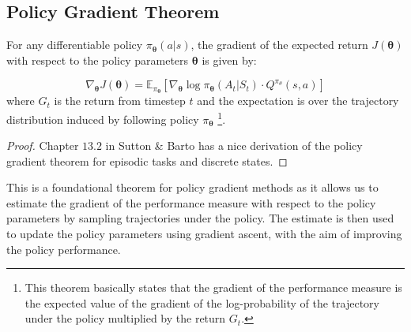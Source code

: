\subsection{Policy Gradient Theorem}
\begin{theorem}
For any differentiable policy $\pi_{\boldsymbol{\theta}}(a|s)$, the gradient of the expected return $J(\boldsymbol{\theta})$ with respect to the policy parameters $\boldsymbol{\theta}$ is given by:

\[
\nabla_{\boldsymbol{\theta}} J(\boldsymbol{\theta}) = \mathbb{E}_{\pi_{\boldsymbol{\theta}}}\left[ \nabla_{\boldsymbol{\theta}} \log \pi_{\boldsymbol{\theta}}(A_t|S_t) \cdot Q^{\pi_{\theta}}(s,a) \right]
\]
where $G_t$ is the return from timestep $t$ and the expectation is over the trajectory distribution induced by following policy $\pi_{\boldsymbol{\theta}}$ \footnote{This theorem basically states that the gradient of the performance measure is the expected value of the gradient of the log-probability of the trajectory under the policy multiplied by the return $G_t$.}. 
\end{theorem}
\begin{proof}
    Chapter $13.2$ in Sutton \& Barto has a nice derivation of the policy gradient theorem for episodic tasks and discrete states.
\end{proof}

This is a foundational theorem for policy gradient methods as it allows us to estimate the gradient of the performance measure with respect to the policy parameters by sampling trajectories under the policy. The estimate is then used to update the policy parameters using gradient ascent, with the aim of improving the policy performance.

